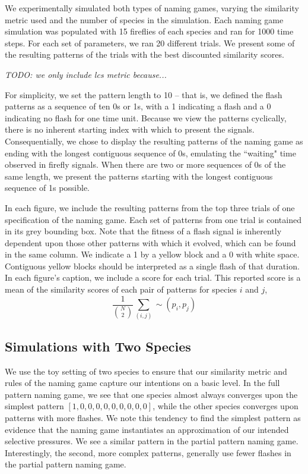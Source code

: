 We experimentally simulated both types of naming games, varying the similarity metric used and the number of species in the simulation.
Each naming game simulation was populated with 15 fireflies of each species and ran for 1000 time steps. 
For each set of parameters, we ran 20 different trials. We present some of the resulting patterns of the trials with the best discounted similarity scores. 

\emph{TODO: we only include lcs metric because...}

For simplicity, we set the pattern length to 10 -- that is, we defined the flash patterns as a sequence of ten 0s or 1s, with a 1 indicating a flash and a 0 indicating no flash for one time unit. 
Because we view the patterns cyclically, there is no inherent starting index with which to present the signals. 
Consequentially, we chose to display the resulting patterns of the naming game as ending with the longest contiguous sequence of 0s, emulating the ``waiting" time observed in firefly signals. When there are two or more sequences of 0s of the same length, we present the patterns starting with the longest contiguous sequence of 1s possible. 

In each figure, we include the resulting patterns from the top three trials of one specification of the naming game. 
Each set of patterns from one trial is contained in its grey bounding box.
Note that the fitness of a flash signal is inherently dependent upon those other patterns with which it evolved, which can be found in the same column. 
We indicate a 1 by a yellow block and a 0 with white space. Contiguous yellow blocks should be interpreted as a single flash of that duration. 
In each figure's caption, we include a score for each trial. This reported score is a mean of the similarity scores of each pair of patterns for species $i$ and $j$, \[ \frac{1}{{N \choose 2}} \sum_{(i,j)} \sim (p_i, p_j) \] 

\subsection{Simulations with Two Species}
We use the toy setting of two species to ensure that our similarity metric and rules of the naming game capture our intentions on a basic level.
In the full pattern naming game, we see that one species almost always converges upon the simplest pattern $[1,0,0,0,0,0,0,0,0,0]$, while the other species converges upon patterns with more flashes. We note this tendency to find the simplest pattern as evidence that the naming game instantiates an approximation of our intended selective pressures. 
We see a similar pattern in the partial pattern naming game. Interestingly, the second, more complex patterns, generally use fewer flashes in the partial pattern naming game. 

